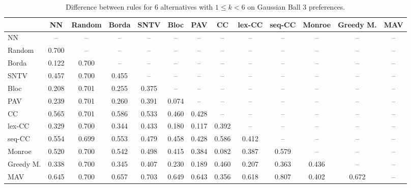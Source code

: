 
\begin{table*}[h!]
\centering
\begin{tabular}{lcccccccccccc}
\toprule
 & NN & Random & Borda & SNTV & Bloc & PAV & CC & lex-CC & seq-CC & Monroe & Greedy M. & MAV \\
\midrule
NN & -- & -- & -- & -- & -- & -- & -- & -- & -- & -- & -- & -- \\
Random & 0.700 & -- & -- & -- & -- & -- & -- & -- & -- & -- & -- & -- \\
Borda & 0.122 & 0.700 & -- & -- & -- & -- & -- & -- & -- & -- & -- & -- \\
SNTV & 0.457 & 0.700 & 0.455 & -- & -- & -- & -- & -- & -- & -- & -- & -- \\
Bloc & 0.208 & 0.701 & 0.255 & 0.375 & -- & -- & -- & -- & -- & -- & -- & -- \\
PAV & 0.239 & 0.701 & 0.260 & 0.391 & 0.074 & -- & -- & -- & -- & -- & -- & -- \\
CC & 0.565 & 0.701 & 0.586 & 0.533 & 0.460 & 0.428 & -- & -- & -- & -- & -- & -- \\
lex-CC & 0.329 & 0.700 & 0.344 & 0.433 & 0.180 & 0.117 & 0.392 & -- & -- & -- & -- & -- \\
seq-CC & 0.554 & 0.699 & 0.553 & 0.479 & 0.458 & 0.428 & 0.586 & 0.412 & -- & -- & -- & -- \\
Monroe & 0.520 & 0.700 & 0.542 & 0.498 & 0.415 & 0.384 & 0.082 & 0.387 & 0.579 & -- & -- & -- \\
Greedy M. & 0.338 & 0.700 & 0.345 & 0.407 & 0.230 & 0.189 & 0.460 & 0.207 & 0.363 & 0.436 & -- & -- \\
MAV & 0.645 & 0.700 & 0.657 & 0.703 & 0.649 & 0.643 & 0.356 & 0.618 & 0.807 & 0.402 & 0.672 & -- \\
\bottomrule
\end{tabular}

\caption{Difference between rules for 6 alternatives with $1 \leq k < 6$ on Gaussian Ball 3 preferences.}
\end{table*}
